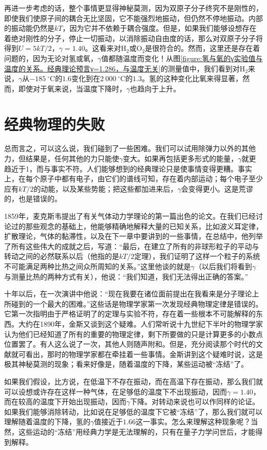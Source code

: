 再进一步考虑的话，整个事情更显得神秘莫测，因为双原子分子终究不是刚性的，即使我们使原子间的耦合无比坚固，它不能强烈地振动，但仍然不停地振动。内部的振动能仍然是$kT$，因为它并不依赖于耦合强度。但是，如果我们能够设想存在着绝对刚性的分子，停止一切振动，以消除振动自由度的话，那么对双原子分子将得到$U=5kT/2$，$\gamma=1.40$。这看来对H$_2$或O$_2$是很符合的。然而，这里还是存在着问题的，因为无论对氢或氧，$\gamma$值都随温度而变化！从图\ref{figure:氢与氧的γ实验值与温度的关系。经典理论预言γ=1.286，与温度无关}的测量值中，我们看到对H$_2$来说，$\gamma$从$-185~^\circ$C的$1.6$变化到在$2~000~^\circ$C的$1.3$。氢的这种变化比氧来得显著，然而，即使对于氧来说，当温度下降时，$\gamma$也趋向于上升。

\section{经典物理的失败}

总而言之，可以这么说，我们碰到了一些困难。我们可以试用除弹力以外的其他力，但结果是，任何其他的力只能使$\gamma$变大。如果再包括更多形式的能量，$\gamma$就更趋近于1，而与事实不符。人们能够想到的经典理论只是使事情变得更糟。事实上，在每个原子中都有电子，由它们的谱线可知，存在着内部运动；每个电子至少应有$kT/2$的动能，以及某些势能；把这些都加进来后，$\gamma$会变得更小。这是荒谬的，也是错误的。

1859年，麦克斯韦提出了有关气体动力学理论的第一篇出色的论文。在我们已经讨论过的那些观念的基础上，他能够精确地解释大量的已知关系，比如波义耳定律，扩散理论，气体的黏滞性，以及在下一章中要讲到的一些事情，在总结中，他列举了所有这些伟大的成就之后，写道：“最后，在建立了所有的非球形粒子的平动与转动之间的必然联系以后（他指的是$kT/2$定理），我们证明了这样一个粒子的系统不可能满足两种比热之间众所周知的关系。”这里他谈的就是$\gamma$（以后我们将看到$\gamma$与测量比热的两种方式有关），他说：“我们知道，我们无法得出正确的答案。”

十年以后，在一次演讲中他说：“现在我要在诸位面前提出在我看来是分子理论上所碰到的一个最大的困难。”这些话是物理学家第一次发现经典物理定律是错误的。它第一次指明由于严格证明了的定理与实验不符，存在着一些根本不可能解释的东西。大约在1890年，金斯又谈到这个疑难。人们常听说十九世纪下半叶的物理学家认为他们已经知道了所有的重要的物理定律，剩下所要做的只是计算更多的小数点位置罢了。有人这么说了一次，其他人则随声附和。但是，充分阅读那个时代的文献就可看出，那时的物理学家都在牵挂着一些事情。金斯讲到这个疑难时说，这是极其神秘莫测的现象；看来好像是，随着温度的下降，某些运动被“冻结”了。

如果我们假设，比方说，在低温下不存在振动，而在高温下存在振动，那么我们就可以设想或许存在这样一种气体，在足够低的温度下不出现振动，因而$\gamma=1.40$，而在较高的温度下开始出现振动，因而$\gamma$下降。对转动来说也可以作同样的论证。如果我们能够消除转动，比如说在足够低的温度下它被“冻结”了，那么我们就可以理解随着温度的下降，氢的$\gamma$值接近于$1.66$这一事实。怎么来理解这种现象呢？当然，这些运动的“冻结”用经典力学是无法理解的，只有在量子力学问世后，才能得到解释。


